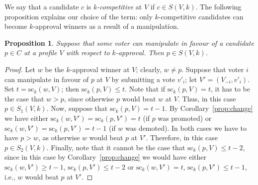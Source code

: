 \documentclass[11pt]{article}
\newtheorem{proposition}{Proposition}
\newcommand{\calR}{\mathcal{R}}
\newcommand{\scr}{\mathrm{sc}}
\begin{document}
We say that a candidate $c$ is {\em $k$-competitive} at $V$ if $c\in S(V, k)$.
The following proposition explains our choice of the term: only $k$-competitive
candidates can become $k$-approval winners as a result of a manipulation.

\begin{proposition}
\label{pinSVk}
Suppose that some voter can manipulate in favour of a candidate $p\in C$
at a profile $V$ with respect to $k$-approval. 
Then $p\in S(V, k)$.
\end{proposition}
\begin{proof}
Let $w$ be the $k$-approval winner at $V$; clearly, $w\neq p$.
Suppose that voter $i$ can manipulate in favour of $p$ at $V$ by submitting a vote $v'_i$;
let $V'=(V_{-i}, v'_i)$.
Set $t=\scr_k(w, V)$; then $\scr_k(p, V)\le t$.
Note that if $\scr_k(p, V)=t$, it has to be the case that $w > p$, since otherwise
$p$ would beat $w$ at $V$. Thus, in this case $p\in S_1(V, k)$.
Now, suppose that $\scr_k(p, V)=t-1$. 
By Corollary~\ref{prop:change} we have either $\scr_k(w, V')=\scr_k(p, V')=t$ (if $p$ was promoted)
or $\scr_k(w, V')=\scr_k(p, V')=t-1$ (if $w$ was demoted). In both cases we have to have $p > w$, 
as otherwise $w$ would beat $p$ at $V'$. Therefore, in this case $p\in S_2(V, k)$.
Finally, note that it cannot be the case that  $\scr_k(p, V)\le t-2$, 
since in this case by Corollary~\ref{prop:change}
we would have either $\scr_k(w, V')\ge t-1$, $\scr_k(p, V')\le t-2$
or $\scr_k(w, V')=t$, $\scr_k(p, V')\le t-1$, i.e., $w$ would beat $p$ at $V'$.
\end{proof}

\end{document}

